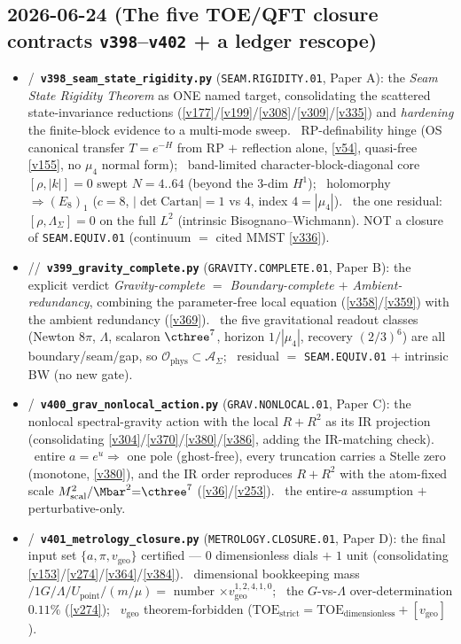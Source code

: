 \subsection*{2026-06-24 (The five TOE/QFT closure contracts \texttt{v398}--\texttt{v402} + a ledger rescope)}
\begin{itemize}
\item \mE/\mO\ \textbf{\texttt{v398\_seam\_state\_rigidity.py}} (\texttt{SEAM.RIGIDITY.01}, Paper A): the \emph{Seam State Rigidity Theorem} as ONE named target, consolidating the scattered state-invariance reductions (\vref{v177}/\vref{v199}/\vref{v308}/\vref{v309}/\vref{v335}) and \emph{hardening} the finite-block evidence to a multi-mode sweep. \mE\ RP-definability hinge (OS canonical transfer $T{=}e^{-H}$ from RP $+$ reflection alone, \vref{v54}, quasi-free \vref{v155}, no $\mu_4$ normal form); \mE\ band-limited character-block-diagonal core $[\rho,|k|]{=}0$ swept $N{=}4..64$ (beyond the $3$-dim $H^1$); \mE\ holomorphy $\Rightarrow(E_8)_1$ ($c{=}8$, $|\!\det\mathrm{Cartan}|{=}1$ vs $4$, index $4{=}|\mu_4|$). \mO\ the one residual: $[\rho,\Lambda_\Sigma]{=}0$ on the full $L^2$ (intrinsic Bisognano--Wichmann). NOT a closure of \texttt{SEAM.EQUIV.01} (continuum $=$ cited MMST \vref{v336}).
\item \mE/\mC/\mO\ \textbf{\texttt{v399\_gravity\_complete.py}} (\texttt{GRAVITY.COMPLETE.01}, Paper B): the explicit verdict \emph{Gravity-complete $=$ Boundary-complete $+$ Ambient-redundancy}, combining the parameter-free local equation (\vref{v358}/\vref{v359}) with the ambient redundancy (\vref{v369}). \mE\ the five gravitational readout classes (Newton $8\pi$, $\Lambda$, scalaron $\cthree^7$, horizon $1/|\mu_4|$, recovery $(2/3)^6$) are all boundary/seam/gap, so $\mathcal O_{\mathrm{phys}}\subset\mathcal A_\Sigma$; \mO\ residual $=$ \texttt{SEAM.EQUIV.01} $+$ intrinsic BW (no new gate).
\item \mE/\mO\ \textbf{\texttt{v400\_grav\_nonlocal\_action.py}} (\texttt{GRAV.NONLOCAL.01}, Paper C): the nonlocal spectral-gravity action with the local $R{+}R^2$ as its IR projection (consolidating \vref{v304}/\vref{v370}/\vref{v380}/\vref{v386}, adding the IR-matching check). \mE\ entire $a{=}e^u\Rightarrow$ one pole (ghost-free), every truncation carries a Stelle zero (monotone, \vref{v380}), and the IR order reproduces $R{+}R^2$ with the atom-fixed scale $M_{\mathrm{scal}}^2/\Mbar^2{=}\cthree^7$ (\vref{v36}/\vref{v253}). \mO\ the entire-$a$ assumption $+$ perturbative-only.
\item \mE/\mO\ \textbf{\texttt{v401\_metrology\_closure.py}} (\texttt{METROLOGY.CLOSURE.01}, Paper D): the final input set $\{a,\pi,v_{\mathrm{geo}}\}$ certified --- $0$ dimensionless dials $+$ $1$ unit (consolidating \vref{v153}/\vref{v274}/\vref{v364}/\vref{v384}). \mE\ dimensional bookkeeping mass$/1G/\Lambda/U_{\mathrm{point}}/(m/\mu){=}$ number $\times v_{\mathrm{geo}}^{1,2,4,1,0}$; \mE\ the $G$-vs-$\Lambda$ over-determination $0.11\%$ (\vref{v274}); \mO\ $v_{\mathrm{geo}}$ theorem-forbidden ($\mathrm{TOE}_{\mathrm{strict}}{=}\mathrm{TOE}_{\mathrm{dimensionless}}{+}[v_{\mathrm{geo}}]$).

\end{itemize}
